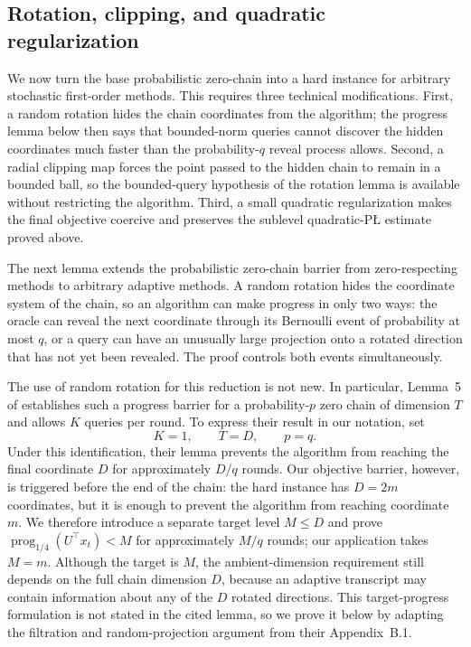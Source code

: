 \documentclass[11pt]{article}
\newcommand{\prog}{\operatorname{prog}}
\begin{document}
\subsection{Rotation, clipping, and quadratic regularization}
\label{app:sto-clipping}

We now turn the base probabilistic zero-chain into a hard instance for arbitrary stochastic first-order methods. This
requires three technical modifications. First, a random rotation hides the chain coordinates from the algorithm; the
progress lemma below then says that bounded-norm queries cannot discover the hidden coordinates much faster than the
probability-\(q\) reveal process allows. Second, a radial clipping map forces the point passed to the hidden chain to
remain in a bounded ball, so the bounded-query hypothesis of the rotation lemma is available without restricting the
algorithm. Third, a small quadratic regularization makes the final objective coercive and preserves the sublevel
quadratic-P\L{} estimate proved above.


The next lemma extends the probabilistic zero-chain barrier from zero-respecting methods to arbitrary adaptive
methods. A random rotation hides the coordinate system of the chain, so an algorithm can make progress in only two
ways: the oracle can reveal the next coordinate through its Bernoulli event of probability at most \(q\), or a query
can have an unusually large projection onto a rotated direction that has not yet been revealed. The proof controls
both events simultaneously.

The use of random rotation for this reduction is not new. In particular, Lemma~5 of
\citet{ArjevaniEtAl2019} establishes such a progress barrier for a probability-\(p\) zero chain of dimension \(T\)
and allows \(K\) queries per round. To express their result in our notation, set
\[
K=1,\qquad T=D,\qquad p=q.
\]
Under this identification, their lemma prevents the algorithm from reaching the final coordinate \(D\) for
approximately \(D/q\) rounds. Our objective barrier, however, is triggered before the end of the chain: the hard
instance has \(D=2m\) coordinates, but it is enough to prevent the algorithm from reaching coordinate \(m\). We
therefore introduce a separate target level \(M\le D\) and prove
\(\prog_{1/4}(U^\top x_t)<M\) for approximately \(M/q\) rounds; our application takes \(M=m\). Although the target
is \(M\), the ambient-dimension requirement still depends on the full chain dimension \(D\), because an adaptive
transcript may contain information about any of the \(D\) rotated directions. This target-progress formulation is not
stated in the cited lemma, so we prove it below by adapting the filtration and random-projection argument from their
Appendix~B.1.
\end{document}
